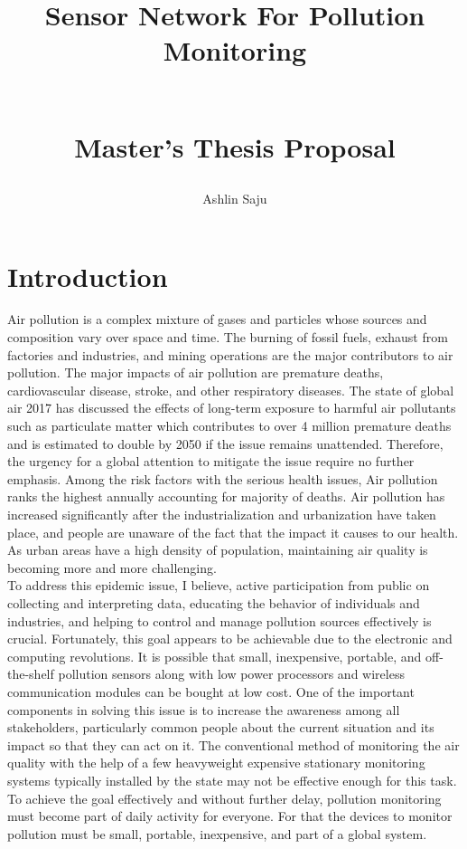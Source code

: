 \documentclass[10pt,a4paper]{report}
\title{\begin{Large}
\textbf{Sensor Network For Pollution Monitoring}
\end{Large}\\ Master's Thesis Proposal}
\author{Ashlin Saju}
\date{}
\begin{document}
\maketitle
\tableofcontents
\newpage

\chapter{Introduction}Air pollution is a complex mixture of gases and particles whose sources and composition vary over space and time\cite{HealthEffectsInstitute2017}. The burning of fossil fuels, exhaust from factories and industries, and mining operations are the major contributors to air pollution. The major impacts of air pollution are premature deaths, cardiovascular disease, stroke, and other respiratory diseases. The state of global air 2017 has discussed the effects of long-term exposure to harmful air pollutants such as particulate matter which contributes to over 4 million premature deaths and is estimated to double by 2050 if the issue remains unattended\cite{HealthEffectsInstitute2017}. Therefore, the urgency for a global attention to mitigate the issue require no further emphasis. Among the risk factors with the serious health issues, Air pollution ranks the highest annually accounting for majority of deaths. Air pollution has increased significantly after the industrialization and urbanization have taken place, and people are unaware of the fact that the impact it causes to our health. As urban areas have a high density of population, maintaining air quality is becoming more and more challenging\cite{DCRMG17}.\\
					
					To address this epidemic issue, I believe, active participation from public on collecting and interpreting data, educating the behavior of individuals and industries, and helping to control and manage pollution sources effectively is crucial. Fortunately, this goal appears to be achievable due to the electronic and computing revolutions. It is possible that small, inexpensive, portable, and off-the-shelf pollution sensors along with low power processors and wireless communication modules can be bought at low cost. One of the important components in solving this issue is to increase the awareness among all stakeholders, particularly common people about the current situation and its impact so that they can act on it. The conventional method of monitoring the air quality with the help of a few heavyweight expensive stationary monitoring systems typically installed by the state may not be effective enough for this task. To achieve the goal effectively and without further delay, pollution monitoring must become part of daily activity for everyone. For that the devices to monitor pollution must be small, portable, inexpensive, and part of a global system.\\
 
\end{document}
